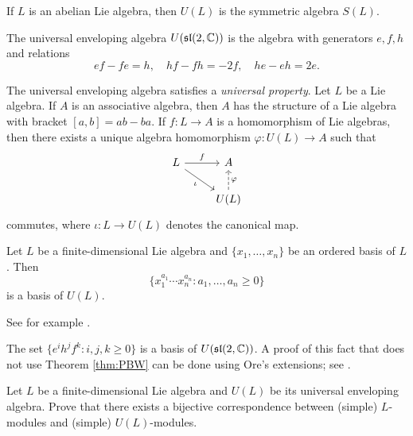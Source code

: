 \begin{example}
    If $L$ is an abelian Lie algebra, then $U(L)$ is 
    the symmetric algebra $S(L)$. 
\end{example}

\begin{example}
    The universal enveloping algebra $U(\mathfrak{sl}(2,\mathbb{C}))$ 
    is the algebra with generators $e,f,h$ and relations 
    \[
    ef-fe=h,\quad
    hf-fh=-2f,\quad
    he-eh=2e.
    \]
\end{example}


The universal enveloping algebra satisfies a \emph{universal property}. 
Let $L$ be a Lie algebra. If $A$ is an associative algebra, then
$A$ has the structure of a Lie algebra with
bracket 
$[a,b]=ab-ba$. If $f\colon L\to A$ is a homomorphism of Lie algebras, 
then there exists a unique algebra homomorphism
$\varphi\colon U(L)\to A$ such that 
\[
\begin{tikzcd}
	L & A \\
	& U(L)
	\arrow["f", from=1-1, to=1-2]
	\arrow["{\iota }"', from=1-1, to=2-2]
	\arrow["\varphi"', dashed, from=2-2, to=1-2]
\end{tikzcd}
\]
commutes, where $\iota\colon L\to U(L)$ 
denotes the canonical map. 


\begin{theorem}
    \label{thm:PBW}
    Let $L$ be a finite-dimensional Lie algebra and 
    $\{x_1,\dots,x_n\}$ be an ordered basis of $L$. Then 
    \[
    \{x_1^{a_1}\cdots x_n^{a_n}:a_1,\dots,a_n\geq0\}
    \]
    is a basis of $U(L)$. 
\end{theorem}

See for example \cite[\S17.4]{MR499562}. 

\begin{example}
    The set $\{e^ih^jf^k:i,j,k\geq0\}$ is a basis of $U(\mathfrak{sl}(2,\mathbb{C}))$. A proof of this 
    fact that does not use Theorem \ref{thm:PBW} 
    can be done using Ore's extensions; see \cite[Proposition 3.2]{MR1321145}.
\end{example}


\begin{exercise}
    Let $L$ be a finite-dimensional Lie algebra and $U(L)$ be its
    universal enveloping algebra. Prove that there exists a bijective
    correspondence between (simple) $L$-modules and (simple) $U(L)$-modules. 
\end{exercise}

